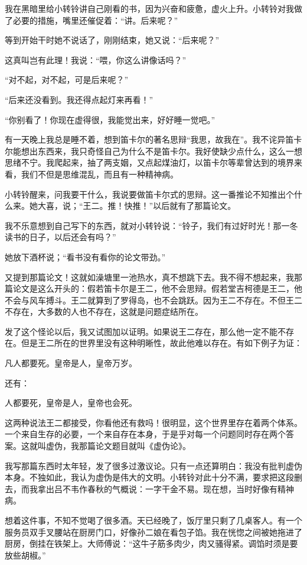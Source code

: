  我在黑暗里给小转铃讲自己刚看的书，因为兴奋和疲惫，虚火上升。小转铃对我做了必要的措施，嘴里还催促着：“讲。后来呢？” 
 
 等到开始干时她不说话了，刚刚结束，她又说：“后来呢？” 
 
 这真叫岂有此理！我说：“喂，你这么讲像话吗？” 
 
 “对不起，对不起，可是后来呢？” 
 
 “后来还没看到。我还得点起灯来再看！” 
 
 “你别看了！你现在虚得很，我能觉出来，好好睡一觉吧。” 
 
 有一天晚上我总是睡不着，想到笛卡尔的著名思辩“我思，故我在”。我不诧异笛卡尔能想出东西来，我只奇怪自己为什么不是笛卡尔。我好使缺少点什么，这么一想思绪不宁。我爬起来，抽了两支姻，又点起煤油灯，以笛卡尔等辈曾达到的境界来看，我们不但是思维混乱，而且有一种精神病。 
 
 小转铃醒来，问我要干什么，我说要做笛卡尔式的思辩。这一番推论不知推出个什么来。她大喜，说；“王二。推！快推！”以后就有了那篇论文。 
 
 我不乐意想到自己写下的东西，就对小转铃说：“铃子，我们有过好时光！那一冬读书的日子，以后还会有吗？” 
 
 她放下酒杯说；“看书没有看你的论文带劲。” 
 
 又提到那篇论文！这就如澡塘里一池热水，真不想跳下去。我不得不想起来，我那篇论文是这么开头的：假若笛卡尔是王二，他不会思辩。假若堂吉柯德是王二，他不会与风车搏斗。王二就算到了罗得岛，也不会跳跃。因为王二不存在。不但王二不存在，大多数的人也不存在，这就是问题症结所在。 
 
 发了这个怪论以后，我又试图加以证明。如果说王二存在，那么他一定不能不存在。但是王二所在的世界里没有这种明晰性，故此他难以存在。有如下例子为证： 
 
 凡人都要死。皇帝是人，皇帝万岁。 
 
 还有： 
 
 人都要死，皇帝是人，皇帝也会死。 
 
 这两种说法王二都接受，你看他还有救吗！很明显，这个世界里存在着两个体系。一个来自生存的必要，一个来自存在本身，于是乎对每一个问题同时存在两个答案。这就叫虚伪，我那篇论文题目就叫《虚伪论》。 
 
 我写那篇东西时太年轻，发了很多过激议论。只有一点还算明白：我没有批判虚伪本身。不独如此，我认为虚伪是伟大的文明。小转铃对此十分不满，要求把这段删去，而我拿出吕不韦作春秋的气概说：一字干金不易。现在想，当时好像有精神病。 
 
 想着这件事，不知不觉喝了很多酒。天已经晚了，饭厅里只剩了几桌客人。有一个服务员双手叉腰站在厨房门口，好像孙二娘在看包子馅。我在恍惚之间被她拖进了厨房，倒挂在铁架上。大师傅说：“这牛子筋多肉少，肉又骚得紧。调馅时须是要放些胡椒。” 
 

